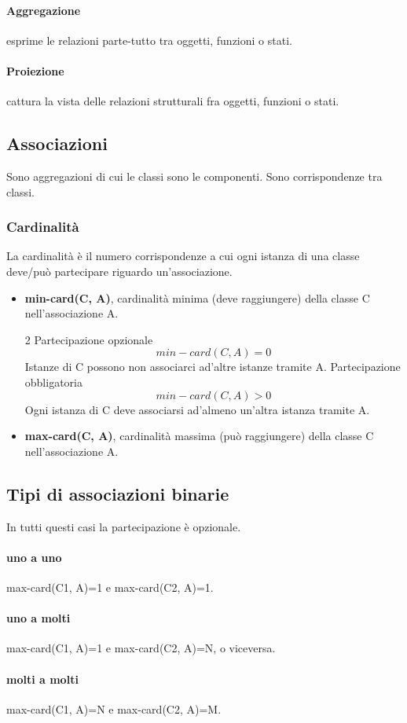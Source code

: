 \paragraph{Aggregazione} esprime le relazioni parte-tutto tra oggetti, funzioni o stati.
\paragraph{Proiezione} cattura la vista delle relazioni strutturali fra oggetti, funzioni o stati.
\subsection{Associazioni}
Sono aggregazioni di cui le classi sono le componenti. Sono corrispondenze tra classi.
\subsubsection{Cardinalità}
La cardinalità è il numero corrispondenze a cui ogni istanza di una classe deve/può partecipare riguardo un'associazione.
\begin{itemize}
	\item \textbf{min-card(C, A)}, cardinalità minima (deve raggiungere) della classe C nell'associazione A.
	\begin{paracol}{2}
		\noindent Partecipazione opzionale \[min-card(C, A)=0\] Istanze di C possono non associarci ad'altre istanze tramite A.
		\switchcolumn
		\noindent Partecipazione obbligatoria \[min-card(C, A)>0\] Ogni istanza di C deve associarsi ad'almeno un'altra istanza tramite A.
	\end{paracol}
	\item \textbf{max-card(C, A)}, cardinalità massima (può raggiungere) della classe C nell'associazione A.
\end{itemize}
\subsection{Tipi di associazioni binarie}
In tutti questi casi la partecipazione è opzionale.
\paragraph{uno a uno} max-card(C1, A)=1 e max-card(C2, A)=1.
\paragraph{uno a molti} max-card(C1, A)=1 e max-card(C2, A)=N, o viceversa.
\paragraph{molti a molti} max-card(C1, A)=N e max-card(C2, A)=M.